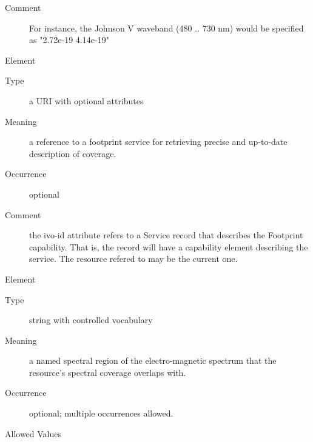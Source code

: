 \documentclass[11pt,a4paper]{ivoa}
\begin{document}
\begin{generated}
\begin{bigdescription}
\begin{description}
\item[Comment] 
                  For instance, the Johnson V waveband (480 .. 730 nm)
                  would be specified as {"}2.72e-19 4.14e-19{"}
               

\end{description}
\item[Element \xmlel{footprint}]
\begin{description}
\item[Type] a URI with optional attributes
\item[Meaning] 
                  a reference to a footprint service for retrieving 
                  precise and up-to-date description of coverage.  
               
\item[Occurrence] optional
\item[Comment] 
                  the ivo-id attribute refers to a Service record
                  that describes the Footprint capability.  That is,
                  the record will have a capability element describing
                  the service.  The resource refered to may be the 
                  current one.  
               

\end{description}
\item[Element \xmlel{waveband}]
\begin{description}
\item[Type] string with controlled vocabulary
\item[Meaning] 
                  a named spectral region of the electro-magnetic spectrum 
                  that the resource's spectral coverage overlaps with.
               
\item[Occurrence] optional; multiple occurrences allowed.

\item[Allowed Values]\hfil
{}
\end{description}
\end{bigdescription}
\end{generated}
\end{document}
